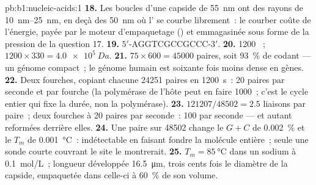 \begin{solution}{pb:b1:nucleic-acids:1}
\textbf{18.} Les boucles d'une capside de \qty{55}{nm} ont des rayons de
\qtyrange{10}{25}{nm}, en deçà des \qty{50}{nm} où l' se courbe
librement~: le courber coûte de l'énergie, payée par le moteur
d'empaquetage () et emmagasinée sous forme de la pression de la
question 17.
\textbf{19.} $5'$-AGGTCGCCGCCC-$3'$.
\textbf{20.} \num{1200} ~; $1200\times 330 = \qty{4.0e5}{Da}$.
\textbf{21.} $75\times 600 = \num{45000}$ paires, soit \qty{93}{\%} de
codant --- un génome compact~; le génome humain est soixante fois moins
dense en gènes.
\textbf{22.} Deux fourches, copiant chacune \num{24251} paires en
\qty{1200}{s}~: \qty{20}{} paires par seconde et par fourche (la
polymérase de l'hôte peut en faire \qty{1000}{}~; c'est le cycle entier
qui fixe la durée, non la polymérase).
\textbf{23.} $\num{121207}/\num{48502} = 2.5$ liaisons par paire~; deux fourches à 20 paires par seconde~: 100  par seconde --- et autant reformées derrière elles.
\textbf{24.} Une paire sur \num{48502} change le $G + C$ de
\qty{0.002}{\%} et le $T_m$ de \qty{0.001}{\celsius}~: indétectable en
faisant fondre la molécule entière~; seule une sonde courte couvrant le
site le montrerait.
\textbf{25.} $T_m = \qty{85}{\celsius}$ dans un sodium à
\qty{0.1}{mol/L}~; longueur développée \qty{16.5}{\micro m}, trois cents
fois le diamètre de la capside, empaquetée dans celle-ci à \qty{60}{\%}
de son volume.
\end{solution}
